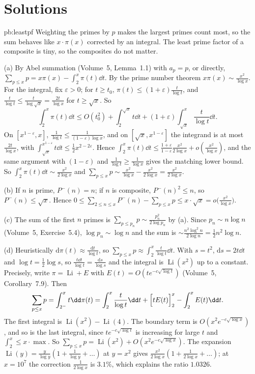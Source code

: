 \section{Solutions}

\begin{solution}{pb:leastpf}
\idea Weighting the primes by $p$ makes the largest primes count most, so the sum behaves like $x\cdot\pi(x)$ corrected by an integral. The least prime factor of a composite is tiny,
so the composites do not matter.

\writeup (a) By Abel summation (Volume~5, Lemma~1.1) with $a_p=p$, or directly, $\sum_{p\le x}p=x\pi(x)-\int_2^x\pi(t)\dd t$. By the prime number theorem $x\pi(x)\sim\frac{x^2}{\log x}$.
For the integral, fix $\varepsilon>0$; for $t\ge t_0$, $\pi(t)\le(1+\varepsilon)\frac t{\log t}$, and $\frac t{\log t}\le\frac t{\log\sqrt x}=\frac{2t}{\log x}$ for $t\ge\sqrt x$. So
\[
\int_2^x\pi(t)\dd t\le O(t_0^2)+\int_2^{\sqrt x}t\dd t+(1+\varepsilon)\int_{\sqrt x}^x\frac t{\log t}\dd t.
\]
On $[x^{1-\varepsilon},x]$, $\frac1{\log t}\le\frac1{(1-\varepsilon)\log x}$, and on $[\sqrt x,x^{1-\varepsilon}]$ the integrand is at most $\frac{2t}{\log x}$, with
$\int_{\sqrt x}^{x^{1-\varepsilon}}t\dd t\le\frac12x^{2-2\varepsilon}$. Hence $\int_2^x\pi(t)\dd t\le\frac{1+\varepsilon}{1-\varepsilon}\frac{x^2}{2\log x}+o(\frac{x^2}{\log x})$, and the same argument
with $(1-\varepsilon)$ and $\frac1{\log t}\ge\frac1{\log x}$ gives the matching lower bound. So $\int_2^x\pi(t)\dd t\sim\frac{x^2}{2\log x}$ and $\sum_{p\le x}p\sim\frac{x^2}{\log x}-\frac{x^2}{2\log x}=\frac{x^2}{2\log x}$.

(b) If $n$ is prime, $P^-(n)=n$; if $n$ is composite, $P^-(n)^2\le n$, so $P^-(n)\le\sqrt x$. Hence $0\le\sum_{2\le n\le x}P^-(n)-\sum_{p\le x}p\le x\cdot\sqrt x=o\bigl(\frac{x^2}{\log x}\bigr)$.

(c) The sum of the first $n$ primes is $\sum_{p\le p_n}p\sim\frac{p_n^2}{2\log p_n}$ by (a). Since $p_n\sim n\log n$ (Volume~5, Exercise~5.4), $\log p_n\sim\log n$ and the sum is
$\sim\frac{n^2\log^2n}{2\log n}=\frac12n^2\log n$.

(d) Heuristically $\mathrm d\pi(t)\approx\frac{\mathrm dt}{\log t}$, so $\sum_{p\le x}p\approx\int_2^x\frac t{\log t}\dd t$. With $s=t^2$, $\mathrm ds=2t\dd t$ and $\log t=\frac12\log s$, so
$\frac{t\dd t}{\log t}=\frac{\mathrm ds}{\log s}$ and the integral is $\operatorname{Li}(x^2)$ up to a constant. Precisely, write $\pi=\operatorname{Li}+E$ with $E(t)=O(te^{-c\sqrt{\log t}})$ (Volume~5,
Corollary~7.9). Then
\[
\sum_{p\le x}p=\int_{2^-}^xt\dd\pi(t)=\int_2^x\frac t{\log t}\dd t+\Bigl[tE(t)\Bigr]_2^x-\int_2^xE(t)\dd t.
\]
The first integral is $\operatorname{Li}(x^2)-\operatorname{Li}(4)$. The boundary term is $O(x^2e^{-c\sqrt{\log x}})$, and so is the last integral, since $te^{-c\sqrt{\log t}}$ is increasing for
large $t$ and $\int_2^x\le x\cdot\max$. So $\sum_{p\le x}p=\operatorname{Li}(x^2)+O(x^2e^{-c\sqrt{\log x}})$. The expansion $\operatorname{Li}(y)=\frac y{\log y}(1+\frac1{\log y}+\dots)$ at
$y=x^2$ gives $\frac{x^2}{2\log x}(1+\frac1{2\log x}+\dots)$; at $x=10^7$ the correction $\frac1{2\log x}$ is $3.1\%$, which explains the ratio $1.0326$.


\end{solution}
